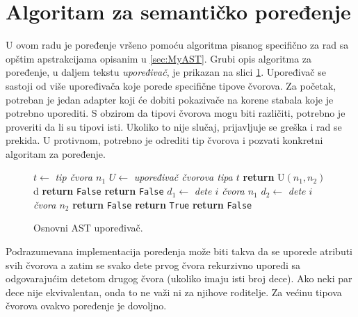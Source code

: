 \section{Algoritam za semantičko poređenje}
\label{sec:ASTComparingAlgorithm}

U ovom radu je poređenje vršeno pomoću algoritma pisanog specifično za rad sa opštim apstrakcijama opisanim u \ref{sec:MyAST}. Grubi opis algoritma za poređenje, u daljem tekstu \emph{upoređivač}, je prikazan na slici \ref{fig:ComparisonAlgorithmPseudo}. Upoređivač se sastoji od više upoređivača koje porede specifične tipove čvorova. Za početak, potreban je jedan adapter koji će dobiti pokazivače na korene stabala koje je potrebno uporediti. S obzirom da tipovi čvorova mogu biti različiti, potrebno je proveriti da li su tipovi isti. Ukoliko to nije slučaj, prijavljuje se greška i rad se prekida. U protivnom, potrebno je odrediti tip čvorova i pozvati konkretni algoritam za poređenje. 

\begin{figure}[!h]
\begin{algorithmic}[1]
    \State $t \gets$ \emph{tip čvora $n_1$}
        \State $U \gets$ \emph{upoređivač čvorova tipa $t$}
        \State \textbf{return} U$(n_1, n_2)$
    \Else
        d
            \State \textbf{return} \texttt{False}
        \Else        
                \State \textbf{return} \texttt{False}
            \EndIf
                \State $d_1 \gets $ \emph{dete $i$ čvora $n_1$}
                \State $d_2 \gets $ \emph{dete $i$ čvora $n_2$}
                    \State \textbf{return} \texttt{False}
                \EndIf
            \EndFor
            \State \textbf{return} \texttt{True}
        \EndIf
    \EndIf
\Else
    \State \textbf{return} \texttt{False}
\EndIf
\EndProcedure
\end{algorithmic}
\caption{Osnovni AST upoređivač.}
\label{fig:ComparisonAlgorithmPseudo}
\end{figure}

Podrazumevana implementacija poređenja može biti takva da se uporede atributi svih čvorova a zatim se svako dete prvog čvora rekurzivno uporedi sa odgovarajućim detetom drugog čvora (ukoliko imaju isti broj dece). Ako neki par dece nije ekvivalentan, onda to ne važi ni za njihove roditelje. Za većinu tipova čvorova ovakvo poređenje je dovoljno. 

